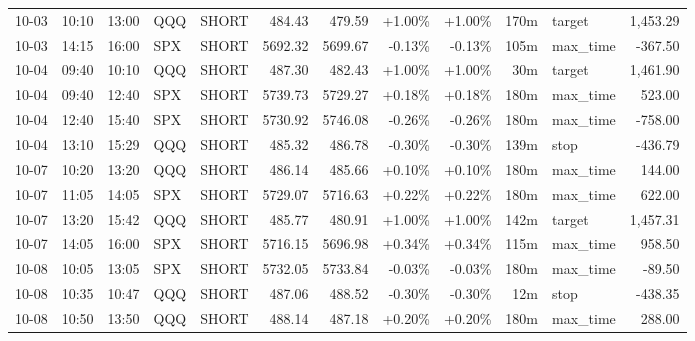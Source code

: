 \documentclass[11pt,a4paper,twoside]{article}
\begin{document}
\begin{center}
\begin{longtable}{>{\color{txtmain}}l l l l l r r r r r >{\color{txtmain}}l r}
10-03 & 10:10 & 13:00 & QQQ & SHORT & 484.43 & 479.59 & \textcolor{wingreen}{+1.00\%} & \textcolor{wingreen}{+1.00\%} & 170m & target & \textcolor{wingreen}{1,453.29} \\
10-03 & 14:15 & 16:00 & SPX & SHORT & 5692.32 & 5699.67 & \textcolor{lossred}{-0.13\%} & \textcolor{lossred}{-0.13\%} & 105m & max\_time & \textcolor{lossred}{-367.50} \\
10-04 & 09:40 & 10:10 & QQQ & SHORT & 487.30 & 482.43 & \textcolor{wingreen}{+1.00\%} & \textcolor{wingreen}{+1.00\%} & 30m & target & \textcolor{wingreen}{1,461.90} \\
10-04 & 09:40 & 12:40 & SPX & SHORT & 5739.73 & 5729.27 & \textcolor{wingreen}{+0.18\%} & \textcolor{wingreen}{+0.18\%} & 180m & max\_time & \textcolor{wingreen}{523.00} \\
10-04 & 12:40 & 15:40 & SPX & SHORT & 5730.92 & 5746.08 & \textcolor{lossred}{-0.26\%} & \textcolor{lossred}{-0.26\%} & 180m & max\_time & \textcolor{lossred}{-758.00} \\
10-04 & 13:10 & 15:29 & QQQ & SHORT & 485.32 & 486.78 & \textcolor{lossred}{-0.30\%} & \textcolor{lossred}{-0.30\%} & 139m & stop & \textcolor{lossred}{-436.79} \\
10-07 & 10:20 & 13:20 & QQQ & SHORT & 486.14 & 485.66 & \textcolor{wingreen}{+0.10\%} & \textcolor{wingreen}{+0.10\%} & 180m & max\_time & \textcolor{wingreen}{144.00} \\
10-07 & 11:05 & 14:05 & SPX & SHORT & 5729.07 & 5716.63 & \textcolor{wingreen}{+0.22\%} & \textcolor{wingreen}{+0.22\%} & 180m & max\_time & \textcolor{wingreen}{622.00} \\
10-07 & 13:20 & 15:42 & QQQ & SHORT & 485.77 & 480.91 & \textcolor{wingreen}{+1.00\%} & \textcolor{wingreen}{+1.00\%} & 142m & target & \textcolor{wingreen}{1,457.31} \\
10-07 & 14:05 & 16:00 & SPX & SHORT & 5716.15 & 5696.98 & \textcolor{wingreen}{+0.34\%} & \textcolor{wingreen}{+0.34\%} & 115m & max\_time & \textcolor{wingreen}{958.50} \\
10-08 & 10:05 & 13:05 & SPX & SHORT & 5732.05 & 5733.84 & \textcolor{lossred}{-0.03\%} & \textcolor{lossred}{-0.03\%} & 180m & max\_time & \textcolor{lossred}{-89.50} \\
10-08 & 10:35 & 10:47 & QQQ & SHORT & 487.06 & 488.52 & \textcolor{lossred}{-0.30\%} & \textcolor{lossred}{-0.30\%} & 12m & stop & \textcolor{lossred}{-438.35} \\
10-08 & 10:50 & 13:50 & QQQ & SHORT & 488.14 & 487.18 & \textcolor{wingreen}{+0.20\%} & \textcolor{wingreen}{+0.20\%} & 180m & max\_time & \textcolor{wingreen}{288.00} \\

\end{longtable}
\end{center}
\end{document}
